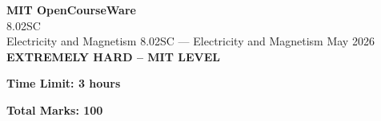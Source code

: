 \documentclass[12pt,a4paper]{exam}
\begin{document}
\begin{center}
{\LARGE \textbf{MIT OpenCourseWare}}\\8.02SC\\Electricity and Magnetism
\vspace{0.5cm}
{8.02SC} --- {Electricity and Magnetism}
\vspace{0.3cm}
May 2026
\vspace{0.3cm}
\textbf{EXTREMELY HARD -- MIT LEVEL}
\end{center}

\begin{center}
\textbf{Time Limit: 3 hours}
\end{center}

\begin{center}
\textbf{Total Marks: 100}
\end{center}

\vspace{0.5cm}
\end{document}
